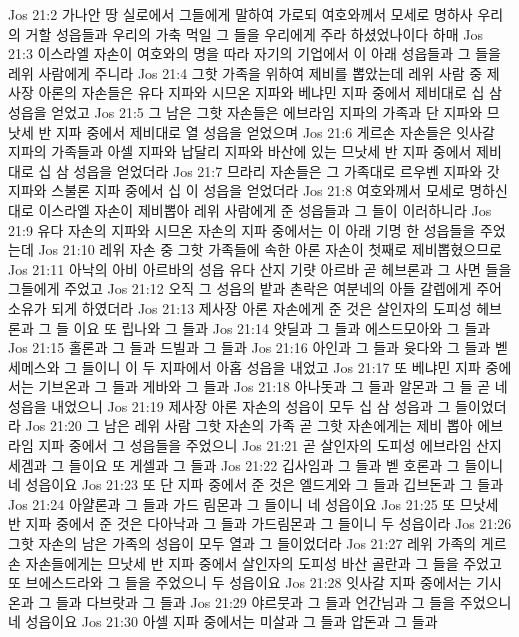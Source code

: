 Jos 21:2  가나안 땅 실로에서 그들에게 말하여 가로되 여호와께서 모세로 명하사 우리의 거할 성읍들과 우리의 가축 먹일 그 들을 우리에게 주라 하셨었나이다 하매
Jos 21:3  이스라엘 자손이 여호와의 명을 따라 자기의 기업에서 이 아래 성읍들과 그 들을 레위 사람에게 주니라
Jos 21:4  그핫 가족을 위하여 제비를 뽑았는데 레위 사람 중 제사장 아론의 자손들은 유다 지파와 시므온 지파와 베냐민 지파 중에서 제비대로 십 삼 성읍을 얻었고
Jos 21:5  그 남은 그핫 자손들은 에브라임 지파의 가족과 단 지파와 므낫세 반 지파 중에서 제비대로 열 성읍을 얻었으며
Jos 21:6  게르손 자손들은 잇사갈 지파의 가족들과 아셀 지파와 납달리 지파와 바산에 있는 므낫세 반 지파 중에서 제비대로 십 삼 성읍을 얻었더라
Jos 21:7  므라리 자손들은 그 가족대로 르우벤 지파와 갓 지파와 스불론 지파 중에서 십 이 성읍을 얻었더라
Jos 21:8  여호와께서 모세로 명하신 대로 이스라엘 자손이 제비뽑아 레위 사람에게 준 성읍들과 그 들이 이러하니라
Jos 21:9  유다 자손의 지파와 시므온 자손의 지파 중에서는 이 아래 기명 한 성읍들을 주었는데
Jos 21:10  레위 자손 중 그핫 가족들에 속한 아론 자손이 첫째로 제비뽑혔으므로
Jos 21:11  아낙의 아비 아르바의 성읍 유다 산지 기럇 아르바 곧 헤브론과 그 사면 들을 그들에게 주었고
Jos 21:12  오직 그 성읍의 밭과 촌락은 여분네의 아들 갈렙에게 주어 소유가 되게 하였더라
Jos 21:13  제사장 아론 자손에게 준 것은 살인자의 도피성 헤브론과 그 들 이요 또 립나와 그 들과
Jos 21:14  얏딜과 그 들과 에스드모아와 그 들과
Jos 21:15  홀론과 그 들과 드빌과 그 들과
Jos 21:16  아인과 그 들과 윳다와 그 들과 벧 세메스와 그 들이니 이 두 지파에서 아홉 성읍을 내었고
Jos 21:17  또 베냐민 지파 중에서는 기브온과 그 들과 게바와 그 들과
Jos 21:18  아나돗과 그 들과 알몬과 그 들 곧 네 성읍을 내었으니
Jos 21:19  제사장 아론 자손의 성읍이 모두 십 삼 성읍과 그 들이었더라
Jos 21:20  그 남은 레위 사람 그핫 자손의 가족 곧 그핫 자손에게는 제비 뽑아 에브라임 지파 중에서 그 성읍들을 주었으니
Jos 21:21  곧 살인자의 도피성 에브라임 산지 세겜과 그 들이요 또 게셀과 그 들과
Jos 21:22  깁사임과 그 들과 벧 호론과 그 들이니 네 성읍이요
Jos 21:23  또 단 지파 중에서 준 것은 엘드게와 그 들과 깁브돈과 그 들과
Jos 21:24  아얄론과 그 들과 가드 림몬과 그 들이니 네 성읍이요
Jos 21:25  또 므낫세 반 지파 중에서 준 것은 다아낙과 그 들과 가드림몬과 그 들이니 두 성읍이라
Jos 21:26  그핫 자손의 남은 가족의 성읍이 모두 열과 그 들이었더라
Jos 21:27  레위 가족의 게르손 자손들에게는 므낫세 반 지파 중에서 살인자의 도피성 바산 골란과 그 들을 주었고 또 브에스드라와 그 들을 주었으니 두 성읍이요
Jos 21:28  잇사갈 지파 중에서는 기시온과 그 들과 다브랏과 그 들과
Jos 21:29  야르뭇과 그 들과 언간님과 그 들을 주었으니 네 성읍이요
Jos 21:30  아셀 지파 중에서는 미살과 그 들과 압돈과 그 들과
